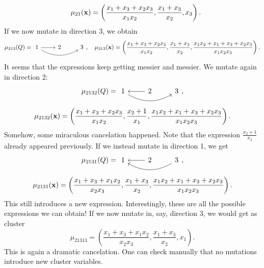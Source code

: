 \begin{example}
\begin{equation*}
		\quad \mu_{21}(\mathbf{x}) = \left(\frac{x_1 + x_3 + x_2x_3}{x_1x_2}, \frac{x_1 + x_3}{x_2}, x_3\right).
	\end{equation*}
	If we now mutate in direction 3, we obtain
	\begin{equation*}
		\mu_{213}(Q) =
		\begin{tikzcd}
			1 \rar[] \ar[rr, bend right] & 2 & 3
		\end{tikzcd},
		\quad \mu_{213}(\bx) = \left(\frac{x_1 + x_3 + x_2x_3}{x_1x_2}, \frac{x_1 + x_3}{x_2}, \frac{x_1 x_2 + x_1 + x_3 + x_2 x_3}{x_1x_2x_3}\right).
	\end{equation*}
	It seems that the expressions keep getting messier and messier. We mutate again in direction 2:
	\begin{equation*}
		\mu_{2132}(Q) =
		\begin{tikzcd}
			1 \rar[leftarrow] \ar[rr, bend right] & 2 & 3
		\end{tikzcd},
	\end{equation*}
	\begin{equation*}
		\mu_{2132}(\mathbf{x})= \left(\frac{x_1 + x_3 + x_2x_3}{x_1x_2}, \frac{x_2 + 1}{x_1}, \frac{x_1 x_2 + x_1 + x_3 + x_2 x_3}{x_1x_2x_3}\right).
	\end{equation*}
	Somehow, some miraculous cancelation happened.
	Note that the expression $\frac{x_2 + 1}{x_2}$ already appeared previously.
	If we instead mutate in direction 1, we get
	\begin{equation*}
		\mu_{2131}(Q) =
		\begin{tikzcd}
			1 \rar[leftarrow] \ar[rr,leftarrow, bend right] & 2 & 3
		\end{tikzcd},
	\end{equation*}
	\begin{equation*}
		\mu_{2131}(\mathbf{x}) = \left(\frac{x_1 + x_3 + x_1x_2}{x_2x_3}, \frac{x_1 + x_3}{x_2}, \frac{x_1 x_2 + x_1 + x_3 + x_2 x_3}{x_1x_2x_3}\right).
	\end{equation*}
	This still introduces a new expression.
	Interestingly, these are all the possible expressions we can obtain!
	If we now mutate in, say, direction 3, we would get as cluster
	\begin{equation*}
		\mu_{21313} = \left(\frac{x_1 + x_3 + x_1x_2}{x_2x_3}, \frac{x_1 + x_3}{x_2}, x_1 \right).
	\end{equation*}
	This is again a dramatic cancelation. One can check manually
	that no mutations introduce new cluster variables.
\end{example}

